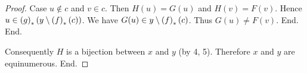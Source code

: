 \documentclass{article}
\begin{document}
\begin{forthel}
\begin{proof}
          Case $u \notin c$ and $v \in c$.
            Then $H(u) = G(u)$ and $H(v) = F(v)$.
            Hence $u \in \left(g\right)_{*}(y \setminus \left(f\right)_{*}(c))$.
            We have $G(u) \in y \setminus \left(f\right)_{*}(c)$.
            Thus $G(u) \neq F(v)$.
          End.
        End.

        Consequently $H$ is a bijection between $x$ and $y$ (by 4, 5).
        Therefore $x$ and $y$ are equinumerous.
      End.
    \end{proof}
  \end{forthel}

  \printbibliography
\end{document}
